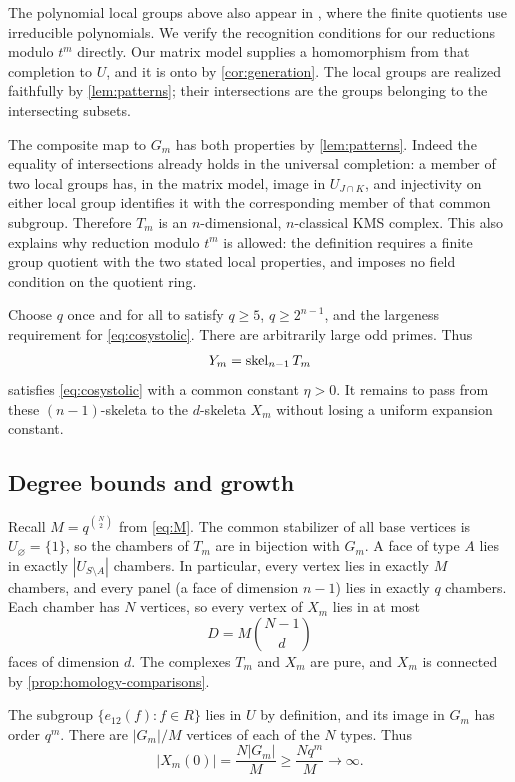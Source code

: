 The polynomial local groups above also appear in
\cite[Example~4.13]{OVB}, where the finite quotients use irreducible
polynomials. We verify the recognition conditions for our reductions
modulo $t^m$ directly. Our matrix model supplies
a homomorphism from that completion to $U$, and it is onto by
\cref{cor:generation}. The local groups are realized faithfully by
\cref{lem:patterns}; their intersections are the groups belonging to
the intersecting subsets.

The composite map to $G_m$ has both properties by \cref{lem:patterns}.
Indeed the equality of intersections already holds in the universal
completion: a member of two local groups has, in the matrix model,
image in $U_{J\cap K}$, and injectivity on either local group identifies
it with the corresponding member of that common subgroup.
Therefore $T_m$ is an $n$-dimensional, $n$-classical KMS complex.
This also explains why reduction modulo $t^m$ is allowed: the definition
requires a finite group quotient with the two stated local properties,
and imposes no field condition on the quotient ring.

Choose $q$ once and for all to satisfy $q\ge5$, $q\ge2^{n-1}$, and the
largeness requirement for \eqref{eq:cosystolic}. There are arbitrarily
large odd primes. Thus
\[
 Y_m=\operatorname{skel}_{n-1}T_m
\]
satisfies \eqref{eq:cosystolic} with a common constant $\eta>0$.
It remains to pass from these $(n-1)$-skeleta to the $d$-skeleta $X_m$
without losing a uniform expansion constant.

\subsection{Degree bounds and growth}

Recall $M=q^{\binom N2}$ from \eqref{eq:M}. The common stabilizer of all
base vertices is $U_{\varnothing}=\{1\}$, so the chambers of $T_m$ are
in bijection with $G_m$. A face of type $A$ lies in exactly
$|U_{S\setminus A}|$ chambers. In particular, every vertex lies in exactly
$M$ chambers, and every panel (a face of dimension $n-1$) lies in exactly
$q$ chambers. Each chamber has $N$ vertices, so every vertex of $X_m$
lies in at most
\begin{equation}\label{eq:D}
 D=M\binom{N-1}{d}
\end{equation}
faces of dimension $d$. The complexes $T_m$ and $X_m$ are pure, and
$X_m$ is connected by \cref{prop:homology-comparisons}.

The subgroup $\{e_{12}(f):f\in R\}$ lies in $U$ by definition, and its
image in $G_m$ has order $q^m$. There are $|G_m|/M$ vertices of each
of the $N$ types. Thus
\begin{equation}\label{eq:growth}
 |X_m(0)|=\frac{N|G_m|}{M}\ge\frac{Nq^m}{M}\longrightarrow\infty.
\end{equation}

